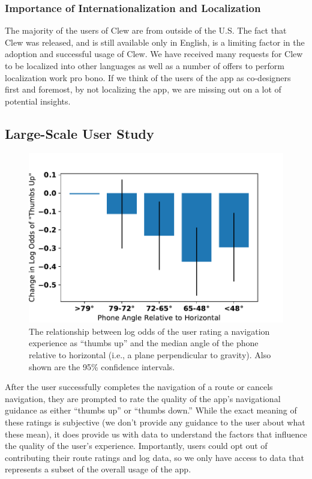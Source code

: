 \documentclass[chi_draft]{sigchi}
\begin{document}
\subsubsection{Importance of Internationalization and Localization}

The majority of the users of Clew are from outside of the U.S.  The fact that Clew was released, and is still available only in English, is a limiting factor in the adoption and successful usage of Clew.  We have received many requests for Clew to be localized into other languages as well as a number of offers to perform localization work pro bono.  If we think of the users of the app as co-designers first and foremost, by not localizing the app, we are missing out on a lot of potential insights. %

\subsection{Large-Scale User Study}\label{sec:largescalestudy}
\begin{figure}
\includegraphics[width=\linewidth]{figures/phoneangle}
\caption{The relationship between log odds of the user rating a navigation experience as ``thumbs up'' and the median angle of the phone relative to horizontal (i.e., a plane perpendicular to gravity).  Also shown are the 95\% confidence intervals.\label{fig:devicepose}}
\end{figure}

After the user successfully completes the navigation of a route or cancels navigation, they are prompted to rate the quality of the app's navigational guidance as either ``thumbs up'' or ``thumbs down.''   While the exact meaning of these ratings is subjective (we don't provide any guidance to the user about what these mean), it does provide us with data to understand the factors that influence the quality of the user's experience.  Importantly, users could opt out of contributing their route ratings and log data, so we only have access to data that represents a subset of the overall usage of the app.
\end{document}
